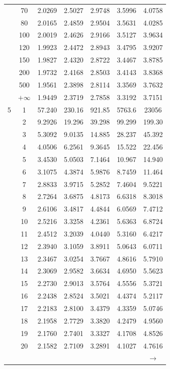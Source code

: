 \begin{minipage}{0.49\textwidth}
\begin{center}
\begin{tabular}{ccccccc}
			& 70 & 2.0269 & 2.5027 & 2.9748 & 3.5996 & 4.0758 \\
			& 80 & 2.0165 & 2.4859 & 2.9504 & 3.5631 & 4.0285 \\
			& 100 & 2.0019 & 2.4626 & 2.9166 & 3.5127 & 3.9634 \\
			& 120 & 1.9923 & 2.4472 & 2.8943 & 3.4795 & 3.9207 \\
			& 150 & 1.9827 & 2.4320 & 2.8722 & 3.4467 & 3.8785 \\
			& 200 & 1.9732 & 2.4168 & 2.8503 & 3.4143 & 3.8368 \\
			& 500 & 1.9561 & 2.3898 & 2.8114 & 3.3569 & 3.7632 \\
			& $+\infty$ & 1.9449 & 2.3719 & 2.7858 & 3.3192 & 3.7151 \\
			\midrule
			5 & 1 & 57.240 & 230.16 & 921.85 & 5763.6 & 23056 \\
			& 2 & 9.2926 & 19.296 & 39.298 & 99.299 & 199.30 \\
			& 3 & 5.3092 & 9.0135 & 14.885 & 28.237 & 45.392 \\
			& 4 & 4.0506 & 6.2561 & 9.3645 & 15.522 & 22.456 \\
			& 5 & 3.4530 & 5.0503 & 7.1464 & 10.967 & 14.940 \\
			& 6 & 3.1075 & 4.3874 & 5.9876 & 8.7459 & 11.464 \\
			& 7 & 2.8833 & 3.9715 & 5.2852 & 7.4604 & 9.5221 \\
			& 8 & 2.7264 & 3.6875 & 4.8173 & 6.6318 & 8.3018 \\
			& 9 & 2.6106 & 3.4817 & 4.4844 & 6.0569 & 7.4712 \\[5pt]
			& 10 & 2.5216 & 3.3258 & 4.2361 & 5.6363 & 6.8724 \\
			& 11 & 2.4512 & 3.2039 & 4.0440 & 5.3160 & 6.4217 \\
			& 12 & 2.3940 & 3.1059 & 3.8911 & 5.0643 & 6.0711 \\
			& 13 & 2.3467 & 3.0254 & 3.7667 & 4.8616 & 5.7910 \\
			& 14 & 2.3069 & 2.9582 & 3.6634 & 4.6950 & 5.5623 \\
			& 15 & 2.2730 & 2.9013 & 3.5764 & 4.5556 & 5.3721 \\
			& 16 & 2.2438 & 2.8524 & 3.5021 & 4.4374 & 5.2117 \\
			& 17 & 2.2183 & 2.8100 & 3.4379 & 4.3359 & 5.0746 \\
			& 18 & 2.1958 & 2.7729 & 3.3820 & 4.2479 & 4.9560 \\
			& 19 & 2.1760 & 2.7401 & 3.3327 & 4.1708 & 4.8526 \\
			& 20 & 2.1582 & 2.7109 & 3.2891 & 4.1027 & 4.7616 \\
			&  &  &  &  &  & $\rightarrow$ \\
		\end{tabular}
	\end{center}
\end{minipage}

